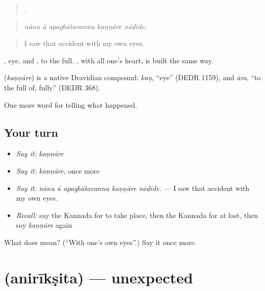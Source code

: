 \begin{quote}
    .
\end{quote}

\begin{quote}
\emph{nānu ā apaghātavannu kaṇṇāre nōḍide.}
\end{quote}

\begin{quote}
I saw that accident with my own eyes.
\end{quote}

, eye, and , to the full. , with all one's heart, is built the same way.

\begin{cousinweb}
\textbf{} (\emph{kaṇṇāre}) is a native Dravidian compound: \emph{kaṇ}, \textquotedblleft{}eye\textquotedblright{} (DEDR 1159), and \emph{āra}, \textquotedblleft{}to the full of, fully\textquotedblright{} (DEDR 368).
\end{cousinweb}

\begin{grammarlens}[title={What you've built}]
One more word for telling what happened.
\end{grammarlens}

\subsection*{Your turn}
\begin{itemize}
\raggedright
  \item \emph{Say it:} \emph{kaṇṇāre}
  \item \emph{Say it:} \emph{kaṇṇāre}, once more
  \item \emph{Say it:} \emph{nānu ā apaghātavannu kaṇṇāre nōḍide.} — I saw that accident with my own eyes.
  \item \emph{Recall:} say the Kannada for to take place, then the Kannada for at last, then say \emph{kaṇṇāre} again
\end{itemize}

\begin{tcolorbox}[breakable,colback=teal!4,colframe=teal!35!black,title={Before you move on}]
What does  mean? (\textquotedblleft{}With one's own eyes\textquotedblright{}.) Say it once more.
\end{tcolorbox}
\section[\texorpdfstring{\kn{ಅನಿರೀಕ್ಷಿತ} (anirīkṣita)}{ಅನಿರೀಕ್ಷಿತ (anirīkṣita)}]{ (anirīkṣita) — unexpected}

